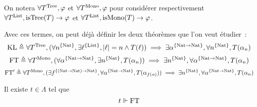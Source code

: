 \documentclass{article}
\begin{document}
\begin{nota}
  On notera $\forall T^{\mathrm{Tree}}, \varphi$ et $\forall T^{\mathrm{Mono}}, \varphi$ pour considérer respectivement $\forall T^{\mathrm{List}}, \mathrm{isTree}(T) \to \varphi$ et $\forall T^{\mathrm{List}}, \mathrm{isMono}(T) \to \varphi$.
\end{nota}

Avec ces termes, on peut déjà définir les deux théorèmes que l'on veut étudier~:
\begin{equation}
  \mathrm{KL} \triangleq \forall T^{\mathrm{Tree}}, (\forall n^{\{\mathrm{Nat}\}}, \exists \ell^{\{\mathrm{List}\}}, |\ell| = n \land T(\ell)) \implies \exists \alpha^{\{\mathrm{Nat}\to\mathrm{Nat}\}}, \forall n^{\{\mathrm{Nat}\}}, T(\alpha_n)
\end{equation}
\begin{equation}
  \mathrm{FT} \triangleq \forall T^{\mathrm{Mono}}, (\forall \alpha^{\{\mathrm{Nat} \to \mathrm{Nat}\}},\exists n^{\{\mathrm{Nat}\}}, T(\alpha_n)) \implies \exists n^{\{\mathrm{Nat}\}}, \forall \alpha^{\{\mathrm{Nat} \to \mathrm{Nat}\}}, T(\alpha_n)
\end{equation}
\begin{equation}
  \mathrm{FT}' \triangleq \forall T^{\mathrm{Mono}}, (\exists f^{\{(\mathrm{Nat}\to\mathrm{Nat})\to\mathrm{Nat}\}}, \forall \alpha^{\{\mathrm{Nat} \to \mathrm{Nat}\}}, T(\alpha_{f(\alpha)})) \implies \exists n^{\{\mathrm{Nat}\}}, \forall \alpha^{\{\mathrm{Nat} \to \mathrm{Nat}\}}, T(\alpha_n)
\end{equation}

\begin{them}[FAN]
  Il existe $t\in \Lambda$ tel que
  \[t\Vdash \mathrm{FT}\]
\end{them}
\end{document}
